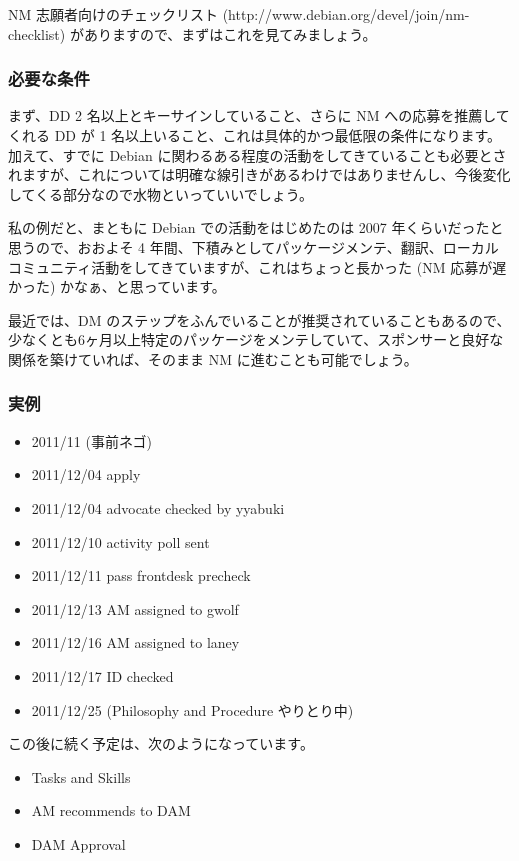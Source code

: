\documentclass[mingoth,a4paper]{jsarticle}
\begin{document}
NM 志願者向けのチェックリスト (http://www.debian.org/devel/join/nm-checklist) がありますので、まずはこれを見てみましょう。

\subsubsection{必要な条件}

まず、DD 2 名以上とキーサインしていること、さらに NM への応募を推薦してくれる DD が 1 名以上いること、これは具体的かつ最低限の条件になります。
加えて、すでに Debian に関わるある程度の活動をしてきていることも必要とされますが、これについては明確な線引きがあるわけではありませんし、今後変化してくる部分なので水物といっていいでしょう。

私の例だと、まともに Debian での活動をはじめたのは 2007 年くらいだったと思うので、おおよそ 4 年間、下積みとしてパッケージメンテ、翻訳、ローカルコミュニティ活動をしてきていますが、これはちょっと長かった (NM 応募が遅かった) かなぁ、と思っています。

最近では、DM のステップをふんでいることが推奨されていることもあるので、少なくとも6ヶ月以上特定のパッケージをメンテしていて、スポンサーと良好な関係を築けていれば、そのまま NM に進むことも可能でしょう。

\subsubsection{実例}

\begin{itemize}
\item 2011/11 (事前ネゴ)
\item 2011/12/04 apply
\item 2011/12/04 advocate checked by yyabuki
\item 2011/12/10 activity poll sent
\item 2011/12/11 pass frontdesk precheck
\item 2011/12/13 AM assigned to gwolf
\item 2011/12/16 AM assigned to laney
\item 2011/12/17 ID checked
\item 2011/12/25 (Philosophy and Procedure やりとり中)
\end{itemize}

この後に続く予定は、次のようになっています。

\begin{itemize}
\item Tasks and Skills
\item AM recommends to DAM
\item DAM Approval
\end{itemize}
\end{document}
